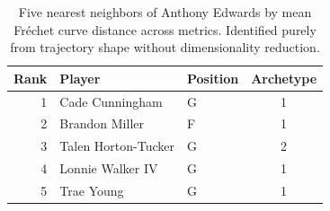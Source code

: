\begin{table}[htbp]
  \centering\small
  \begin{tabular}{rllc}
    \toprule
    Rank & Player & Position & Archetype \\
    \midrule
    1 & Cade Cunningham & G & 1 \\
    2 & Brandon Miller & F & 1 \\
    3 & Talen Horton-Tucker & G & 2 \\
    4 & Lonnie Walker IV & G & 1 \\
    5 & Trae Young & G & 1 \\
    \bottomrule
  \end{tabular}
  \caption{Five nearest neighbors of Anthony Edwards by mean Fr\'{e}chet curve distance across metrics. Identified purely from trajectory shape without dimensionality reduction.}
  \label{tab:Anthony_Edwards_frechet_curve_neighbors}
\end{table}

